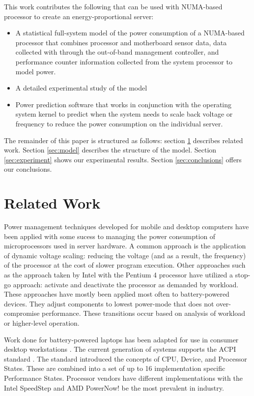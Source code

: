 \documentclass[times, 10pt,onecolumn]{article}
\begin{document}
This work contributes the following that can be used with NUMA-based processor
to create an energy-proportional server:
\begin{itemize}
\item A statistical full-system model of the power consumption of a
  NUMA-based processor that combines processor and motherboard sensor
  data, data collected with through the out-of-band management
  controller, and performance counter information collected from the
  system processor to model power.
\item A detailed experimental study of the model 
\item Power prediction software that works in conjunction with the
  operating system kernel to predict when the system needs to scale back
  voltage or frequency to reduce the power consumption on the individual server.
\end{itemize}

The remainder of this paper is structured as follows: section
\ref{sec:related} describes related work.  Section \ref{sec:model}
describes the structure of the model.  Section \ref{sec:experiment}
shows our experimental results.  Section \ref{sec:conclusions} offers
our conclusions.

\section{Related Work}
\label{sec:related}
Power management techniques developed for mobile and desktop computers have
been applied with some sucess to managing the power consumption of
microprocessors used in server hardware.  A common approach is the
application of dynamic voltage scaling: reducing the voltage (and as a
result, the frequency) of the processor at the cost of slower program
execution. Other approaches such as the approach taken by Intel with the
Pentium 4 processor have utilized a stop-go approach: activate and
deactivate the processor as demanded by workload.  These approaches have
mostly been applied most often to battery-powered devices.  They adjust
components to lowest power-mode that does not over-compromise
performance.  These transitions occur based on analysis of workload or
higher-level operation.

Work done for battery-powered laptops has been adapted for use in
consumer desktop workstations \cite{APM1994}\cite{ACPI2006}.  The
current generation of systems supports the ACPI standard
\cite{ACPI2006}.  The standard introduced the concepts of CPU, Device,
and Processor States.  These are combined into a set of up to 16
implementation specific Performance States. Processor vendors have
different implementations with the Intel SpeedStep \cite{Intel2006} and
AMD PowerNow! \cite{AMD2006} be the most prevalent in industry.
\end{document}
